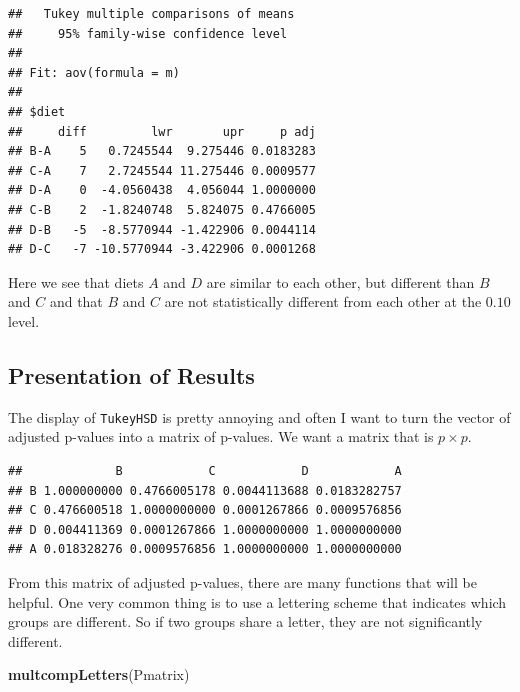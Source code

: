\documentclass[]{book}
\newenvironment{Shaded}{\begin{snugshade}}{\end{snugshade}}
\newcommand{\KeywordTok}[1]{\textcolor[rgb]{0.13,0.29,0.53}{\textbf{{#1}}}}
\newcommand{\StringTok}[1]{\textcolor[rgb]{0.31,0.60,0.02}{{#1}}}
\newcommand{\CommentTok}[1]{\textcolor[rgb]{0.56,0.35,0.01}{\textit{{#1}}}}
\newcommand{\NormalTok}[1]{{#1}}
\theoremstyle{definition}
\theoremstyle{definition}
\theoremstyle{remark}
\begin{document}
\begin{verbatim}
##   Tukey multiple comparisons of means
##     95% family-wise confidence level
## 
## Fit: aov(formula = m)
## 
## $diet
##     diff         lwr       upr     p adj
## B-A    5   0.7245544  9.275446 0.0183283
## C-A    7   2.7245544 11.275446 0.0009577
## D-A    0  -4.0560438  4.056044 1.0000000
## C-B    2  -1.8240748  5.824075 0.4766005
## D-B   -5  -8.5770944 -1.422906 0.0044114
## D-C   -7 -10.5770944 -3.422906 0.0001268
\end{verbatim}

Here we see that diets \(A\) and \(D\) are similar to each other, but
different than \(B\) and \(C\) and that \(B\) and \(C\) are not
statistically different from each other at the \(0.10\) level.

\subsection{Presentation of Results}\label{presentation-of-results}

The display of \texttt{TukeyHSD} is pretty annoying and often I want to
turn the vector of adjusted p-values into a matrix of p-values. We want
a matrix that is \(p \times p\).

\begin{Shaded}
\end{Shaded}

\begin{verbatim}
##             B            C            D            A
## B 1.000000000 0.4766005178 0.0044113688 0.0183282757
## C 0.476600518 1.0000000000 0.0001267866 0.0009576856
## D 0.004411369 0.0001267866 1.0000000000 1.0000000000
## A 0.018328276 0.0009576856 1.0000000000 1.0000000000
\end{verbatim}

From this matrix of adjusted p-values, there are many functions that
will be helpful. One very common thing is to use a lettering scheme that
indicates which groups are different. So if two groups share a letter,
they are not significantly different.

\begin{Shaded}
\begin{Highlighting}[]
\KeywordTok{multcompLetters}\NormalTok{(Pmatrix)}
\end{Highlighting}
\end{Shaded}
\end{document}
